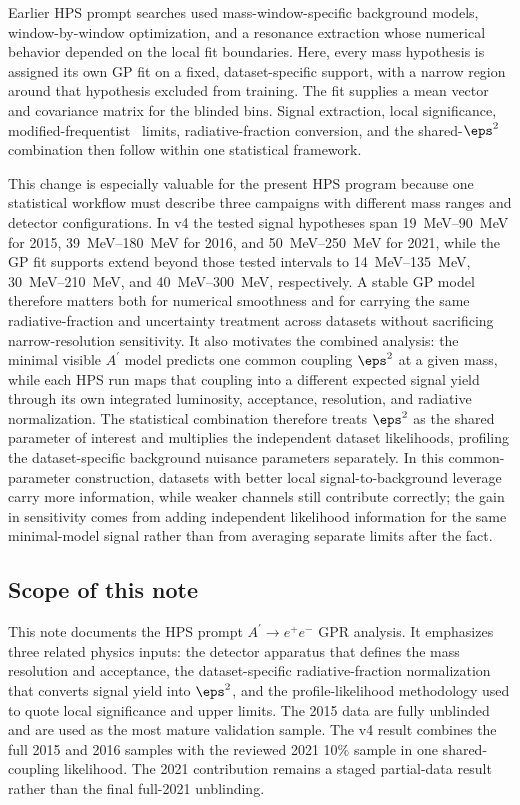 Earlier HPS prompt searches used mass-window-specific background models,
window-by-window optimization, and a resonance extraction whose numerical behavior
depended on the local fit boundaries. Here, every mass hypothesis is assigned its own
GP fit on a fixed, dataset-specific support, with a narrow region around that hypothesis
excluded from training. The fit supplies a mean vector and covariance matrix for the
blinded bins. Signal extraction, local significance, modified-frequentist \CLs\ limits,
radiative-fraction conversion, and the shared-$\eps^2$ combination then follow within
one statistical framework.

This change is especially valuable for the present HPS program because one statistical
workflow must describe three campaigns with different mass ranges and detector
configurations. In v4 the tested signal hypotheses span \SIrange{19}{90}{MeV} for
2015, \SIrange{39}{180}{MeV} for 2016, and \SIrange{50}{250}{MeV} for 2021, while
the GP fit supports extend beyond those tested intervals to
\SIrange{14}{135}{MeV}, \SIrange{30}{210}{MeV}, and
\SIrange{40}{300}{MeV}, respectively. A stable GP model therefore matters both for
numerical smoothness and for carrying the same radiative-fraction and uncertainty
treatment across datasets without sacrificing narrow-resolution sensitivity. It also
motivates the combined analysis:
the minimal visible $A^\prime$ model predicts one common coupling $\eps^2$ at a given
mass, while each HPS run maps that coupling into a different expected signal yield
through its own integrated luminosity, acceptance, resolution, and radiative
normalization. The
statistical combination therefore treats $\eps^2$ as the shared parameter of interest
and multiplies the independent dataset likelihoods, profiling the dataset-specific
background nuisance parameters separately. In this common-parameter construction,
datasets with better local signal-to-background leverage carry more information, while
weaker channels still contribute correctly; the gain in sensitivity comes from adding
independent likelihood information for the same minimal-model signal rather than from
averaging separate limits after the fact.

\subsection{Scope of this note}

This note documents the HPS prompt $A^\prime \rightarrow e^+e^-$ GPR analysis. It
emphasizes three related physics inputs: the detector apparatus that defines the mass
resolution and acceptance, the dataset-specific radiative-fraction normalization that
converts signal yield into
$\eps^2$, and the profile-likelihood methodology used to quote local significance and
upper limits. The 2015 data are fully unblinded and are used as the most mature
validation sample. The v4 result combines the full 2015 and 2016 samples with the
reviewed 2021 10\% sample in one shared-coupling likelihood. The 2021 contribution
remains a staged partial-data result rather than the final full-2021 unblinding.

